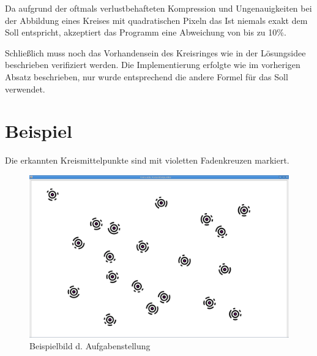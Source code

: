Da aufgrund der oftmals verlustbehafteten Kompression und Ungenauigkeiten bei der Abbildung eines Kreises mit quadratischen Pixeln das Ist niemals exakt dem Soll entspricht, akzeptiert das Programm eine Abweichung von bis zu 10\%. 

Schließlich muss noch das Vorhandensein des Kreisringes wie in der Lösungsidee beschrieben verifiziert werden. Die Implementierung erfolgte wie im vorherigen Absatz beschrieben, nur wurde entsprechend die andere Formel für das Soll verwendet.
\section{Beispiel}
Die erkannten Kreismittelpunkte sind mit violetten Fadenkreuzen markiert.
\begin{figure}[!ht]
	\centering	
	\includegraphics[width=\textwidth]{Grafiken/sek1bsp1}
	\caption{Beispielbild d. Aufgabenstellung}
\end{figure}
